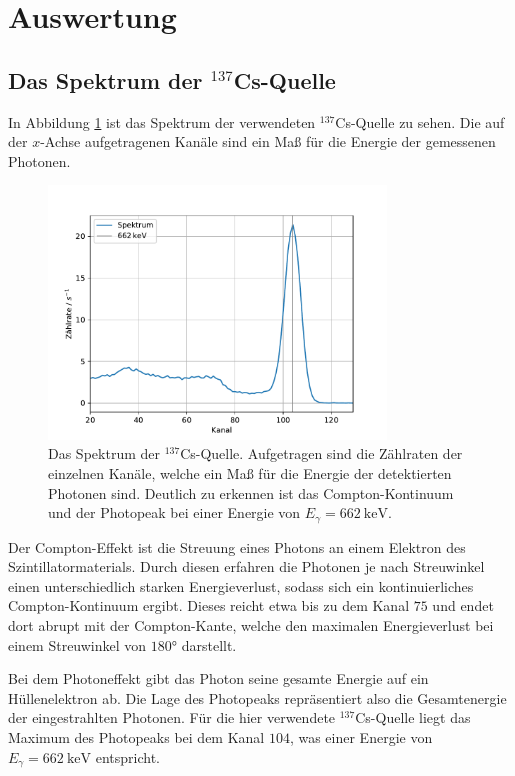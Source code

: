 \section{Auswertung}
\label{sec:Auswertung}

\subsection{Das Spektrum der $^{137}$Cs-Quelle}
In Abbildung \ref{fig:tfig1} ist das Spektrum der verwendeten $^{137}$Cs-Quelle zu sehen.
Die auf der $x$-Achse aufgetragenen Kanäle sind ein Maß für die Energie der gemessenen Photonen.

\begin{figure}
\centering
\includegraphics[width=0.8\textwidth]{figures/Spektrum}
\caption{Das Spektrum der $^{137}$Cs-Quelle. Aufgetragen sind die Zählraten der einzelnen Kanäle, welche ein Maß für die Energie der detektierten Photonen sind.
Deutlich zu erkennen ist das Compton-Kontinuum und der Photopeak bei einer Energie von $E_\gamma = \SI{662}{\keV}$.}
\label{fig:tfig1}
\end{figure}

Der Compton-Effekt ist die Streuung eines Photons an einem Elektron des Szintillatormaterials.
Durch diesen erfahren die Photonen je nach Streuwinkel einen unterschiedlich starken Energieverlust, sodass sich ein kontinuierliches Compton-Kontinuum ergibt.
Dieses reicht etwa bis zu dem Kanal $75$ und endet dort abrupt mit der Compton-Kante, welche den maximalen Energieverlust bei einem Streuwinkel von $180°$ darstellt.

Bei dem Photoneffekt gibt das Photon seine gesamte Energie auf ein Hüllenelektron ab.
Die Lage des Photopeaks repräsentiert also die Gesamtenergie der eingestrahlten Photonen.
Für die hier verwendete $^{137}$Cs-Quelle liegt das Maximum des Photopeaks bei dem Kanal $104$, was einer Energie von $E_\gamma = \SI{662}{\keV}$ entspricht.

